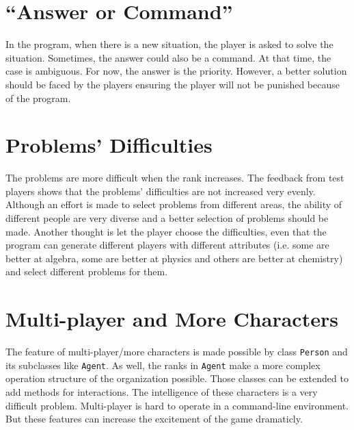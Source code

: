 \documentclass[letterpaper, 11pt]{report}
\begin{document}
\section{``Answer or Command'' }
In the program, when there is a new situation, the player is asked to solve the situation. Sometimes, the answer could also be a command. At that time, the case is ambiguous. For now, the answer is the priority. However, a better solution should be faced by the players ensuring the player will not be punished because of the program.

\section{Problems' Difficulties}
The problems are more difficult when the rank increases. The feedback from test players shows that the problems' difficulties are not increased very evenly. Although an effort is made to select problems from different areas, the ability of different people are very diverse and a better selection of problems should be made. Another thought is let the player choose the difficulties, even that the program can generate different players with different attributes (i.e. some are better at algebra, some are better at physics and others are better at chemistry) and select different problems for them.

\section{Multi-player and More Characters}
The feature of multi-player/more characters is made possible by class \texttt{Person} and its subclasses like \texttt{Agent}. As well, the ranks in \texttt{Agent} make a more complex operation structure of the organization possible. Those classes can be extended to add methods for interactions. The intelligence of these characters is a very difficult problem. Multi-player is hard to operate in a command-line environment. But these features can increase the excitement of the game dramaticly.
\end{document}
